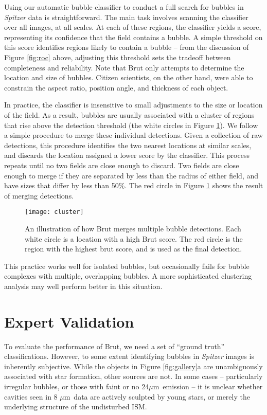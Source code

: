 \documentclass[preprint]{aastex}
\newcommand{\um}[0]{$\mu$m}
\begin{document}
Using our automatic bubble classifier to conduct a full search for bubbles in \textit{Spitzer} data is straightforward. The main task involves scanning the classifier over all images, at all scales. At each of these regions, the classifier yields a score, representing its confidence that the field contains a bubble. A simple threshold on this score identifies regions likely to contain a bubble -- from the discussion of Figure \ref{fig:roc} above, adjusting this threshold sets the tradeoff between completeness and reliability. Note that Brut only attempts to determine the location and size of bubbles. Citizen scientists, on the other hand, were able to constrain the aspect ratio, position angle, and thickness of each object. 

In practice, the classifier is insensitive to small adjustments to the size or location of the field. As a result, bubbles are usually associated with a cluster of regions that rise above the detection threshold (the white circles in Figure \ref{fig:cluster}). We follow a simple procedure to merge these individual detections. Given a collection of raw detections, this procedure identifies the two nearest locations at similar scales, and discards the location assigned a lower score by the classifier. This process repeats until no two fields are close enough to discard. Two fields are close enough to merge if they are separated by less than the radius of either field, and have sizes that differ by less than 50\%. The red circle in Figure \ref{fig:cluster} shows the result of merging detections.

\begin{figure}[h!]
\texttt{[image: cluster]}
\caption{An illustration of how Brut merges multiple bubble detections. Each white circle is a location with a high Brut score. The red circle is the region with the highest brut score, and is used as the final detection.}
\label{fig:cluster}
\end{figure}
 
This practice works well for isolated bubbles, but occasionally fails for bubble complexes with multiple, overlapping bubbles. A more sophisticated clustering analysis may well perform better in this situation.

\section{Expert Validation}
\label{sec:expert}

To evaluate the performance of Brut, we need a set of ``ground truth'' classifications. However, to some extent identifying bubbles in \textit{Spitzer} images is inherently subjective. While the objects in Figure \ref{fig:gallery}a are unambiguously associated with star formation, other sources are not. In some cases -- particularly irregular bubbles, or those with faint or no 24\um\, emission -- it is unclear whether cavities seen in 8 \um\, data are actively sculpted by young stars, or merely the underlying structure of the undisturbed ISM. 
\end{document}
